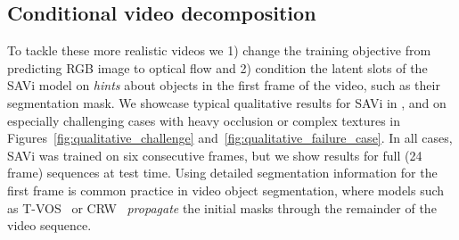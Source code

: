 \documentclass{article}
\newcommand{\modelname}{SAVi\xspace}
\begin{document}
\subsection{Conditional video decomposition}
To tackle these more realistic videos we 1) change the training objective from predicting RGB image to optical flow and 2) condition the latent slots of the SAVi model on \textit{hints} about objects in the first frame of the video, such as their segmentation mask.
We showcase typical qualitative results for \modelname in , and on especially challenging cases with heavy occlusion or complex textures in Figures~\ref{fig:qualitative_challenge} and~\ref{fig:qualitative_failure_case}.
In all cases, \modelname was trained on six consecutive frames, but we show results for full (24 frame) sequences at test time.
Using detailed segmentation information for the first frame is common practice in video object segmentation, where models such as T-VOS~\citep{zhang2020transductive} or CRW~\citep{jabri2020space} \textit{propagate} the initial masks through the remainder of the video sequence. 
\end{document}
